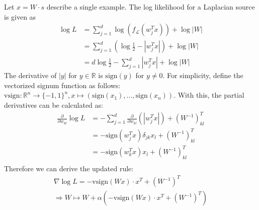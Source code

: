 \begin{answer}
    Let $x = W\cdot s$ describe a single example. The log likelihood for a Laplacian source is given as 
\begin{align*}
    \log L &= \sum_{j=1}^d \log{(f_{\mathcal{L}}(w^T_j x))} + \log{|W|} \\
           &= \sum_{j=1}^d (\log{\frac{1}{2}} - |w^T_j x|)+ \log{|W|} \\
           &= d\log{\frac{1}{2}} - \sum_{j=1}^d |w^T_j x|+ \log{|W|}
\end{align*}
The derivative of $|y|$ for $y\in\mathbb{R}$ is $\mathrm{sign}(y)$ for $y\neq 0$.
For simplicity, define the vectorized signum function as follows:
 $\mathrm{vsign}: \mathbb{R}^n\rightarrow \{-1, 1\}^n, x\mapsto (\mathrm{sign}(x_1), \ldots, \mathrm{sign}(x_n))$.
 With this, the partial derivatives can be calculated as:
 \begin{align*}
    \frac{\partial}{\partial w_{kl}}\log L 
    &= - \sum_{j=1}^d \frac{\partial}{\partial w_{kl }}(|w^T_j x|) + (W^{-1})^T_{kl} \\
    &= -\mathrm{sign}(w^T_j x) \delta_{jk} x_l  + (W^{-1})^T_{kl} \\
    &= -\mathrm{sign}(w^T_k x) x_l  + (W^{-1})^T_{kl} \\
 \end{align*}
 Therefore we can derive the updated rule:
 \begin{align*}
    \nabla \log L  = -\mathrm{vsign}(Wx)\cdot x^T + (W^{-1})^T \\
    \Rightarrow W \mapsto W + \alpha \left(-\mathrm{vsign}(Wx)\cdot x^T + (W^{-1})^T\right)
 \end{align*}
\end{answer}
